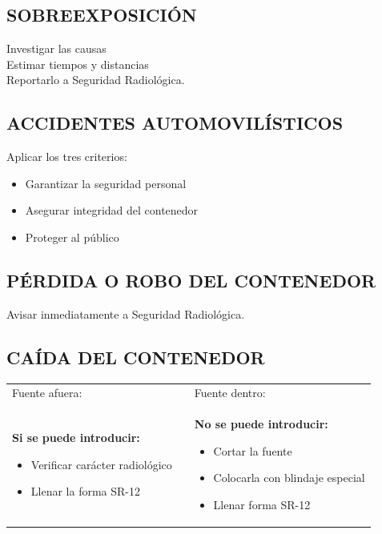 \subsection*{SOBREEXPOSICIÓN}
Investigar las causas\\
Estimar tiempos y distancias\\
Reportarlo a Seguridad Radiológica.

\subsection*{ACCIDENTES AUTOMOVILÍSTICOS}
Aplicar los tres criterios:
\begin{itemize}
    \item Garantizar la seguridad personal
    \item Asegurar integridad del contenedor
    \item Proteger al público
\end{itemize}

\subsection*{PÉRDIDA O ROBO DEL CONTENEDOR}
Avisar inmediatamente a Seguridad Radiológica.

\subsection*{CAÍDA DEL CONTENEDOR}
\begin{tabular}{ p{5.5cm} p{0.5cm} p{5.5cm} }
    Fuente afuera: & & Fuente dentro: \\
    \begin{minipage}[t]{5cm}
        \textbf{Si se puede introducir:} 
        \begin{itemize}
            \item Verificar carácter radiológico
            \item Llenar la forma SR-12
        \end{itemize}
    \end{minipage} 
    & 
    &
    \begin{minipage}[t]{5cm}
        \textbf{No se puede introducir:}
        \begin{itemize}
            \item Cortar la fuente
            \item Colocarla con blindaje especial
            \item Llenar forma SR-12
        \end{itemize}
    \end{minipage} \\
\end{tabular} 

